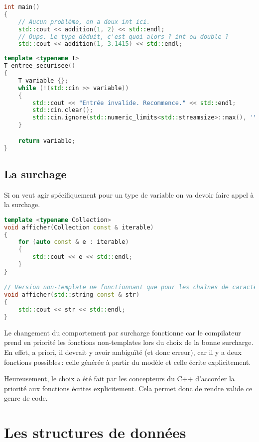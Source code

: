 \documentclass{article}
\begin{document}
\begin{itemize}
\begin{lstlisting}[language=C++]
int main()
{
    // Aucun problème, on a deux int ici.
    std::cout << addition(1, 2) << std::endl;
    // Oups. Le type déduit, c'est quoi alors ? int ou double ?
    std::cout << addition(1, 3.1415) << std::endl;
\end{lstlisting}{}
\begin{lstlisting}[language=C++]
template <typename T>
T entree_securisee()
{
    T variable {};
    while (!(std::cin >> variable))
    {
        std::cout << "Entrée invalide. Recommence." << std::endl;
        std::cin.clear();
        std::cin.ignore(std::numeric_limits<std::streamsize>::max(), '\n');
    }

    return variable;
}
\end{lstlisting}{}

\subsection{La surchage}
Si on veut agir spécifiquement pour un type de variable on va devoir faire appel à la surchage. 
\begin{lstlisting}[language=C++]
template <typename Collection>
void afficher(Collection const & iterable)
{
    for (auto const & e : iterable)
    {
        std::cout << e << std::endl;
    }
}

// Version non-template ne fonctionnant que pour les chaînes de caractères.
void afficher(std::string const & str)
{
    std::cout << str << std::endl;
}
\end{lstlisting}{}
Le changement du comportement par surcharge fonctionne car le compilateur prend en priorité les fonctions non-templates lors du choix de la bonne surcharge. En effet, a priori, il devrait y avoir ambiguïté (et donc erreur), car il y a deux fonctions possibles : celle générée à partir du modèle et celle écrite explicitement.

Heureusement, le choix a été fait par les concepteurs du C++ d’accorder la priorité aux fonctions écrites explicitement. Cela permet donc de rendre valide ce genre de code.

\section{Les structures de données}

\end{itemize}
\end{document}
